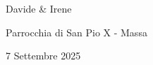 

  \begin{center}

  \vfill

  {\brittany\fontsize{50}{60}\selectfont Davide \& Irene}

  \vspace{0.5cm}


  \vspace{0.5cm}

  {\Large Parrocchia di San Pio X - Massa}

  \vspace{0.5cm}

  {\Large 7 Settembre 2025}

  \vfill
  \end{center}

  \thispagestyle{empty}

\newpage
